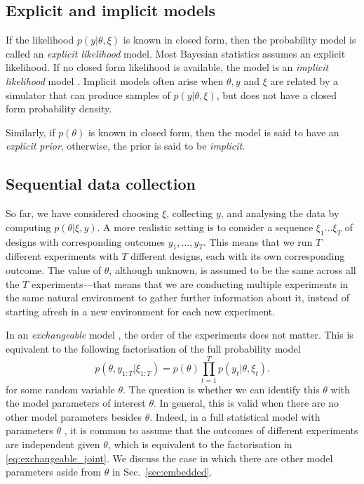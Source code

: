 \documentclass[a4paper, 10pt]{report}
\theoremstyle{plain}
\begin{document}
	
	
	
	\subsection{Explicit and implicit models}
	\label{sec:explicit_implicit}
	If the likelihood $p(y|\theta,\xi)$ is known in closed form, then the probability model is called an \emph{explicit likelihood} model. 
	Most Bayesian statistics assumes an explicit likelihood.
	If no closed form likelihood is available, the model is an \emph{implicit likelihood} model \citep{sisson2018handbook}.
	Implicit models often arise when $\theta,y$ and $\xi$ are related by a simulator \citep{alsing2019fast,brehmer2018constraining,gonccalves2020training} that can produce samples of $p(y|\theta,\xi)$, but does not have a closed form probability density.
	
	Similarly, if $p(\theta)$ is known in closed form, then the model is said to have an \emph{explicit prior}, otherwise, the prior is said to be \emph{implicit}.
	
	
	
	\subsection{Sequential data collection}
	\label{sec:seq_data}
	So far, we have considered choosing $\xi$, collecting $y$, and analysing the data by computing $p(\theta|\xi,y)$.
	A more realistic setting is to consider a sequence $\xi_1\dots\xi_T$ of designs with corresponding outcomes $y_1,\dots,y_T$.
	This means that we run $T$ different experiments with $T$ different designs, each with its own corresponding outcome. The value of $\theta$, although unknown, is assumed to be the same across all the $T$ experiments---that means that we are conducting multiple experiments in the same natural environment to gather further information about it, instead of starting afresh in a new environment for each new experiment.
	
	In an \emph{exchangeable} model \citep{bloem2019probabilistic}, the order of the experiments does not matter. This is equivalent \citep{oksendal2003stochastic} to the following factorisation of the full probability model
	\begin{equation}
	\label{eq:exchangeable_joint}
	p(\theta,y_{1:T}|\xi_{1:T}) = p(\theta)\prod_{t=1}^T p(y_t|\theta,\xi_t).
	\end{equation}
	for some random variable $\theta$.
	The question is whether we can identify this $\theta$ with the model parameters of interest $\theta$.
	In general, this is valid when there are no other model parameters besides $\theta$.
	Indeed, in a full statistical model with parameters $\theta$ \citep{cox2006principles}, it is common to assume that the outcomes of different experiments are independent given $\theta$, which is equivalent to the factorisation in \eqref{eq:exchangeable_joint}.
	We discuss the case in which there are other model parameters aside from $\theta$ in Sec.~\ref{sec:embedded}.
	
\end{document}
